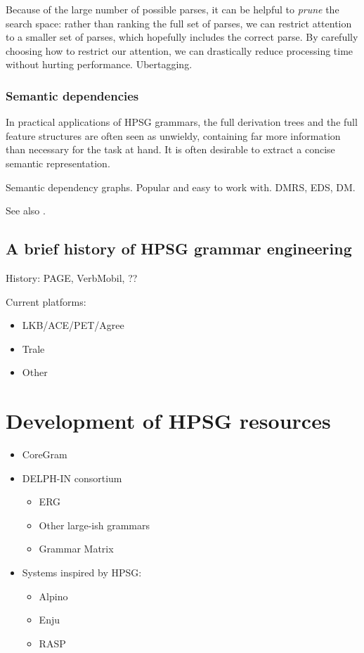 \documentclass[output=paper]{langsci/langscibook}
\begin{document}

Because of the large number of possible parses,
it can be helpful to \textit{prune} the search space:
rather than ranking the full set of parses,
we can restrict attention to a smaller set of parses,
which hopefully includes the correct parse.
By carefully choosing how to restrict our attention,
we can drastically reduce processing time without hurting performance.
Ubertagging.


\subsubsection{Semantic dependencies}
\label{cl:prac:dep}

In practical applications of HPSG grammars,
the full derivation trees and the full feature structures are often seen as unwieldy,
containing far more information than necessary for the task at hand.
It is often desirable to extract a concise semantic representation.

Semantic dependency graphs.
Popular and easy to work with.
DMRS, EDS, DM.

See also .



\subsection{A brief history of HPSG grammar engineering}
\label{cl:history}

History: PAGE, VerbMobil, ?? %

Current platforms:
    \begin{itemize}
    \item LKB/ACE/PET/Agree
    \item Trale
    \item Other
    \end{itemize}


\section{Development of HPSG resources}
\label{cl:resources}


\begin{itemize}
 \item  CoreGram
 \item  DELPH-IN consortium
    \begin{itemize}
    \item ERG
    \item Other large-ish grammars
    \item Grammar Matrix
    \end{itemize}
 \item Systems inspired by HPSG:
   \begin{itemize}
     \item Alpino
     \item Enju
     \item RASP
   \end{itemize}
\end{itemize}
\end{document}
